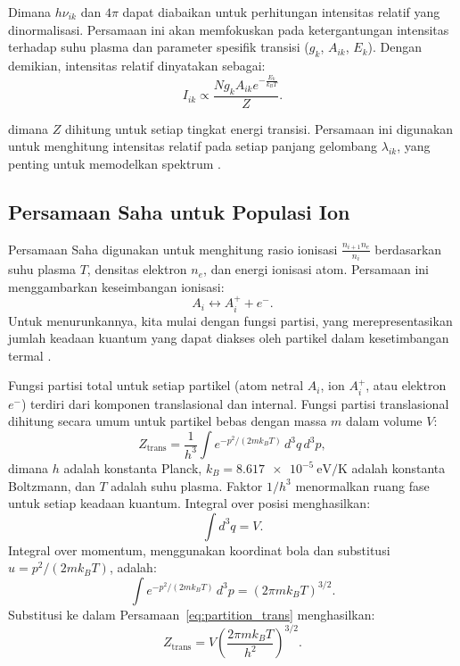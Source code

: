 Dimana \( h \nu_{ik} \) dan \( 4\pi \) dapat diabaikan untuk perhitungan intensitas relatif yang dinormalisasi. Persamaan ini akan memfokuskan pada ketergantungan intensitas terhadap suhu plasma dan parameter spesifik transisi (\( g_k \), \( A_{ik} \), \( E_k \)). Dengan demikian, intensitas relatif dinyatakan sebagai:
\begin{equation}
I_{ik} \propto \frac{N g_k A_{ik} e^{-\frac{E_k}{k_B T}}}{Z}. \label{eq:intensity_relative}
\end{equation}

dimana \( Z \) dihitung untuk setiap tingkat energi transisi. Persamaan ini digunakan untuk menghitung intensitas relatif pada setiap panjang gelombang \( \lambda_{ik} \), yang penting untuk memodelkan spektrum \citep{Rybicki1985,Draine2011,Mason2015}.

\subsection{Persamaan Saha untuk Populasi Ion}

Persamaan Saha digunakan untuk menghitung rasio ionisasi \( \frac{n_{i+1} n_e}{n_i} \) berdasarkan suhu plasma \( T \), densitas elektron \( n_e \), dan energi ionisasi atom. Persamaan ini menggambarkan keseimbangan ionisasi:
\[
A_i \leftrightarrow A_i^+ + e^-.
\]
Untuk menurunkannya, kita mulai dengan fungsi partisi, yang merepresentasikan jumlah keadaan kuantum yang dapat diakses oleh partikel dalam kesetimbangan termal \citep{Pathria2011}.

Fungsi partisi total untuk setiap partikel (atom netral \( A_i \), ion \( A_i^+ \), atau elektron \( e^- \)) terdiri dari komponen translasional dan internal. Fungsi partisi translasional dihitung secara umum untuk partikel bebas dengan massa \( m \) dalam volume \( V \):
\begin{equation}
Z_{\text{trans}} = \frac{1}{h^3} \int e^{-p^2/(2m k_B T)} \, d^3q \, d^3p, \label{eq:partition_trans}
\end{equation}
dimana \( h \) adalah konstanta Planck, \( k_B = \SI{8.617e-5}{\electronvolt\per\kelvin} \) adalah konstanta Boltzmann, dan \( T \) adalah suhu plasma. Faktor \( 1/h^3 \) menormalkan ruang fase untuk setiap keadaan kuantum. Integral over posisi menghasilkan:
\begin{equation}
\int d^3q = V. \label{eq:integral_position}
\end{equation}
Integral over momentum, menggunakan koordinat bola dan substitusi \( u = p^2/(2m k_B T) \), adalah:
\begin{equation}
\int e^{-p^2/(2m k_B T)} \, d^3p = \left( 2\pi m k_B T \right)^{3/2}. \label{eq:integral_momentum}
\end{equation}
Substitusi ke dalam Persamaan~\eqref{eq:partition_trans} menghasilkan:
\begin{equation}
Z_{\text{trans}} = V \left( \frac{2\pi m k_B T}{h^2} \right)^{3/2}. \label{eq:partition_trans_final}
\end{equation}

